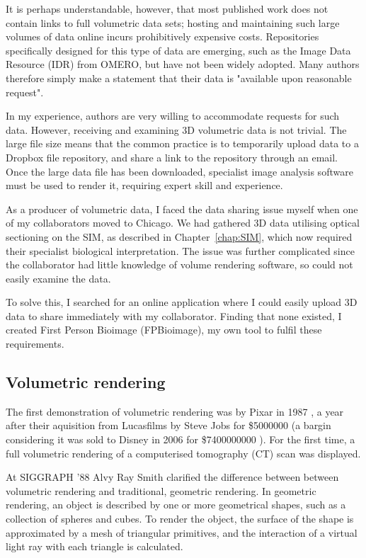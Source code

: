 It is perhaps understandable, however, that most published work does not contain links to full volumetric data sets; hosting and maintaining such large volumes of data online incurs prohibitively expensive costs. 
Repositories specifically designed for this type of data are emerging, such as the Image Data Resource (IDR) from OMERO, but have not been widely adopted. 
Many authors therefore simply make a statement that their data is "available upon reasonable request". 

In my experience, authors are very willing to accommodate requests for such data. 
However, receiving and examining 3D volumetric data is not trivial. 
The large file size means that the common practice is to temporarily upload data to a Dropbox file repository, and share a link to the repository through an email. 
Once the large data file has been downloaded, specialist image analysis software must be used to render it, requiring expert skill and experience. 

As a producer of volumetric data, I faced the data sharing issue myself when one of my collaborators moved to Chicago. 
We had gathered 3D data utilising optical sectioning on the SIM, as described in Chapter~\ref{chap:SIM}, which now required their specialist biological interpretation. 
The issue was further complicated since the collaborator had little knowledge of volume rendering software, so could not easily examine the data. 

To solve this, I searched for an online application where I could easily upload 3D data to share immediately with my collaborator. 
Finding that none existed, I created First Person Bioimage (FPBioimage), my own tool to fulfil these requirements.

\subsection{Volumetric rendering} \label{sec:volumerendering}
The first demonstration of volumetric rendering was by Pixar in 1987 \cite{smith:1987}, a year after their aquisition from Lucasfilms by Steve Jobs for \$\num{5000000} (a bargin considering it was sold to Disney in 2006 for \$\num{7400000000} \cite{pixarfilm:2007, pixarstory:online}).
For the first time, a full volumetric rendering of a computerised tomography (CT) scan was displayed.

At SIGGRAPH '88 \cite{smith:1988panel} Alvy Ray Smith clarified the difference between between volumetric rendering and traditional, geometric rendering.
In geometric rendering, an object is described by one or more geometrical shapes, such as a collection of spheres and cubes.
To render the object, the surface of the shape is approximated by a mesh of triangular primitives, and the interaction of a virtual light ray with each triangle is calculated.

